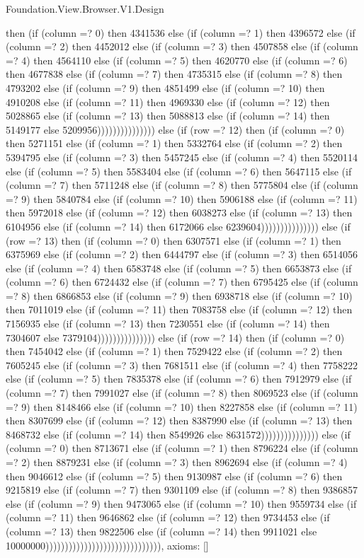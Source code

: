 \begin{lexlean}{Foundation.View.Browser.V1.Design}
\begin{semanticmodule}
{then (if (column =? 0) then 4341536 else (if (column =? 1) then 4396572 else (if (column =? 2) then 4452012 else (if (column =? 3) then 4507858 else (if (column =? 4) then 4564110 else (if (column =? 5) then 4620770 else (if (column =? 6) then 4677838 else (if (column =? 7) then 4735315 else (if (column =? 8) then 4793202 else (if (column =? 9) then 4851499 else (if (column =? 10) then 4910208 else (if (column =? 11) then 4969330 else (if (column =? 12) then 5028865 else (if (column =? 13) then 5088813 else (if (column =? 14) then 5149177 else 5209956))))))))))))))) else (if (row =? 12) then (if (column =? 0) then 5271151 else (if (column =? 1) then 5332764 else (if (column =? 2) then 5394795 else (if (column =? 3) then 5457245 else (if (column =? 4) then 5520114 else (if (column =? 5) then 5583404 else (if (column =? 6) then 5647115 else (if (column =? 7) then 5711248 else (if (column =? 8) then 5775804 else (if (column =? 9) then 5840784 else (if (column =? 10) then 5906188 else (if (column =? 11) then 5972018 else (if (column =? 12) then 6038273 else (if (column =? 13) then 6104956 else (if (column =? 14) then 6172066 else 6239604))))))))))))))) else (if (row =? 13) then (if (column =? 0) then 6307571 else (if (column =? 1) then 6375969 else (if (column =? 2) then 6444797 else (if (column =? 3) then 6514056 else (if (column =? 4) then 6583748 else (if (column =? 5) then 6653873 else (if (column =? 6) then 6724432 else (if (column =? 7) then 6795425 else (if (column =? 8) then 6866853 else (if (column =? 9) then 6938718 else (if (column =? 10) then 7011019 else (if (column =? 11) then 7083758 else (if (column =? 12) then 7156935 else (if (column =? 13) then 7230551 else (if (column =? 14) then 7304607 else 7379104))))))))))))))) else (if (row =? 14) then (if (column =? 0) then 7454042 else (if (column =? 1) then 7529422 else (if (column =? 2) then 7605245 else (if (column =? 3) then 7681511 else (if (column =? 4) then 7758222 else (if (column =? 5) then 7835378 else (if (column =? 6) then 7912979 else (if (column =? 7) then 7991027 else (if (column =? 8) then 8069523 else (if (column =? 9) then 8148466 else (if (column =? 10) then 8227858 else (if (column =? 11) then 8307699 else (if (column =? 12) then 8387990 else (if (column =? 13) then 8468732 else (if (column =? 14) then 8549926 else 8631572))))))))))))))) else (if (column =? 0) then 8713671 else (if (column =? 1) then 8796224 else (if (column =? 2) then 8879231 else (if (column =? 3) then 8962694 else (if (column =? 4) then 9046612 else (if (column =? 5) then 9130987 else (if (column =? 6) then 9215819 else (if (column =? 7) then 9301109 else (if (column =? 8) then 9386857 else (if (column =? 9) then 9473065 else (if (column =? 10) then 9559734 else (if (column =? 11) then 9646862 else (if (column =? 12) then 9734453 else (if (column =? 13) then 9822506 else (if (column =? 14) then 9911021 else 10000000)))))))))))))))))))))))))))))),
  axioms: []
}


\end{semanticmodule}
\end{lexlean}
